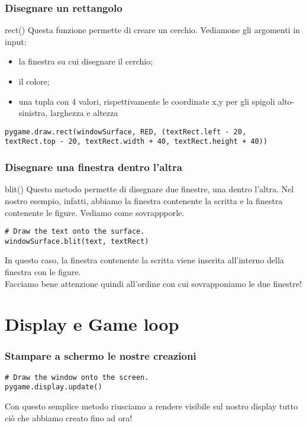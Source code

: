 \documentclass{beamer}
\begin{document}
\begin{frame}[fragile]
\frametitle{Disegnare un rettangolo}
\begin{block}{rect()}
	Questa funzione permette di creare un cerchio. Vediamone gli argomenti in input:
	\begin{itemize}
		\item la finestra su cui disegnare il cerchio;
		\item il colore;
		\item una tupla con 4 valori, rispettivamente le coordinate x,y per gli spigoli alto-sinistra, larghezza e altezza 
	\end{itemize}
\end{block}
\begin{lstlisting}
pygame.draw.rect(windowSurface, RED, (textRect.left - 20,
textRect.top - 20, textRect.width + 40, textRect.height + 40))

\end{lstlisting}
\end{frame}

\begin{frame}[fragile]
\frametitle{Disegnare una finestra dentro l'altra}
\begin{block}{blit()}
	Questo metodo permette di disegnare due finestre, una dentro l'altra. Nel nostro esempio, infatti, abbiamo la finestra contenente la scritta e la finestra contenente le figure. Vediamo come sovrappporle.
\end{block}
\begin{lstlisting}
# Draw the text onto the surface.
windowSurface.blit(text, textRect)
\end{lstlisting}
In questo caso, la finestra contenente la scritta viene inserita all'interno della finestra con le figure.\\
Facciamo bene attenzione quindi all'ordine con cui sovrapponiamo le due finestre!
\end{frame}

\section{Display e Game loop}

\begin{frame}[fragile]
\frametitle{Stampare a schermo le nostre creazioni}
\begin{lstlisting}
# Draw the window onto the screen.
pygame.display.update()
\end{lstlisting}
Con questo semplice metodo riusciamo a rendere visibile sul nostro display tutto ciò che abbiamo creato fino ad ora!
\end{frame}
\end{document}
